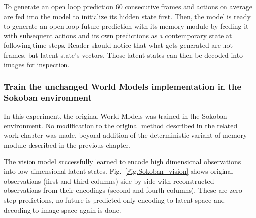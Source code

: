 To generate an open loop prediction 60 consecutive frames and actions on average are fed into the model to initialize its hidden state first. Then, the model is ready to generate an open loop future prediction with its memory module by feeding it with subsequent actions and its own predictions as a contemporary state at following time steps. Reader should notice that what gets generated are not frames, but latent state's vectors. Those latent states can then be decoded into images for inspection.

\subsubsection{Train the unchanged World Models implementation in the Sokoban environment}

In this experiment, the original World Models was trained in the Sokoban environment. No modification to the original method described in the related work chapter was made, beyond addition of the deterministic variant of memory module described in the previous chapter.

The vision model successfully learned to encode high dimensional observations into low dimensional latent states. Fig.~\ref{Fig.Sokoban_vision} shows original observations (first and third columns) side by side with reconstructed observations from their encodings (second and fourth columns). These are zero step predictions, no future is predicted only encoding to latent space and decoding to image space again is done.


